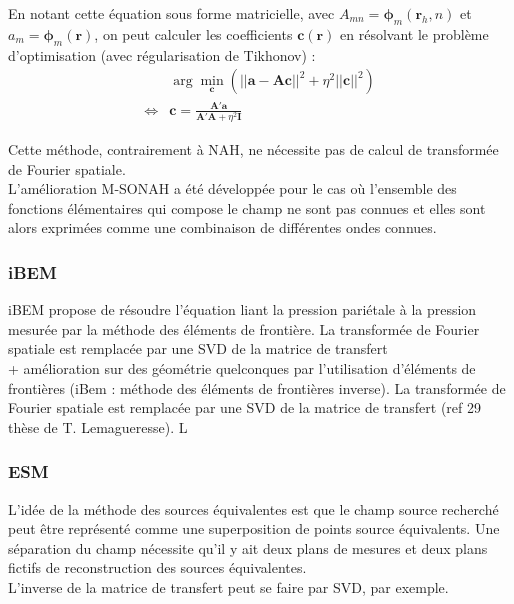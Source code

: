  En notant cette équation sous forme matricielle, avec $A_{mn} =\bm{\phi}_m(\bm{r}_h,n)$ et $a_m= \bm{\phi}_m(\bm{r})$, on peut calculer les coefficients $\bm{c}(\bm{r})$ en résolvant le problème d'optimisation (avec régularisation de Tikhonov) : 
 \begin{align}
	~& \arg\min_{\bm{c}} \left( ||\bm{a}-\bm{Ac}||^2 + \eta^2||\bm{c}||^2\right)\\
	\Leftrightarrow & \bm{c} = \frac{\bm{A}'\bm{a}}{\bm{A}'\bm{A} + \eta^2\bm{I}} 
\end{align}

 
 Cette méthode, contrairement à NAH, ne nécessite pas de calcul de transformée de Fourier spatiale.\\

 L'amélioration M-SONAH a été développée pour le cas où l'ensemble des fonctions élémentaires qui compose le champ ne sont pas connues et elles sont alors exprimées comme une combinaison de différentes ondes connues.

\subsubsection{iBEM}

iBEM propose de résoudre l'équation liant la pression pariétale à  la pression mesurée par la méthode des éléments de frontière.  La transformée de Fourier spatiale est remplacée par une SVD de la matrice de transfert\\
 

+ amélioration sur des géométrie quelconques par l'utilisation d'éléments de frontières (iBem : méthode des éléments de frontières inverse). La transformée de Fourier spatiale est remplacée par une SVD de la matrice de transfert (ref 29 thèse de T. Lemagueresse). L
\subsubsection{ESM}
L'idée de la méthode des sources équivalentes est que le champ source recherché peut être représenté comme une superposition de points source équivalents. Une séparation du champ nécessite qu'il y ait deux plans de mesures et deux plans fictifs de reconstruction des sources équivalentes.\\
L'inverse de la matrice de transfert peut se faire par SVD, par exemple.




